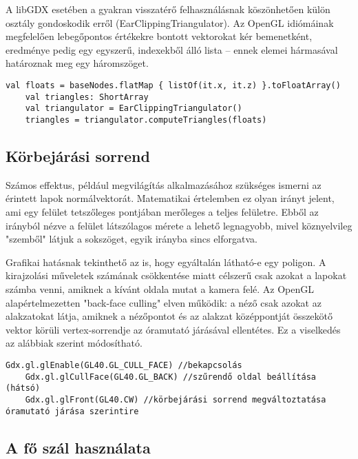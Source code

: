 A libGDX esetében a gyakran visszatérő felhasználásnak köszönhetően külön osztály gondoskodik erről (EarClippingTriangulator). Az OpenGL idiómáinak megfelelően lebegőpontos értékekre bontott vektorokat kér bemenetként, eredménye pedig egy egyszerű, indexekből álló lista -- ennek elemei hármasával határoznak meg egy háromszöget.

\begin{lstlisting}[caption=Példa az EarClippingTriangulator felhasználására]
    val floats = baseNodes.flatMap { listOf(it.x, it.z) }.toFloatArray()
    val triangles: ShortArray
    val triangulator = EarClippingTriangulator()
    triangles = triangulator.computeTriangles(floats)
\end{lstlisting}

\subsection{Körbejárási sorrend}

Számos effektus, például megvilágítás alkalmazásához szükséges ismerni az érintett lapok normálvektorát. Matematikai értelemben ez olyan irányt jelent, ami egy felület tetszőleges pontjában merőleges a teljes felületre. Ebből az irányból nézve a felület látszólagos mérete a lehető legnagyobb, mivel köznyelvileg "szemből" látjuk a sokszöget, egyik irányba sincs elforgatva.

Grafikai hatásnak tekinthető az is, hogy egyáltalán látható-e egy poligon. A kirajzolási műveletek számának csökkentése miatt célszerű csak azokat a lapokat számba venni, amiknek a kívánt oldala mutat a kamera felé. Az OpenGL alapértelmezetten "back-face culling" elven működik: a néző csak azokat az alakzatokat látja, amiknek a nézőpontot és az alakzat középpontját összekötő vektor körüli vertex-sorrendje az óramutató járásával ellentétes. Ez a viselkedés az alábbiak szerint módosítható.

\begin{lstlisting}[caption=Példa az OpenGL culling műveleteinek beállításaira libGDX-en keresztül]
    Gdx.gl.glEnable(GL40.GL_CULL_FACE) //bekapcsolás
    Gdx.gl.glCullFace(GL40.GL_BACK) //szűrendő oldal beállítása (hátsó)
    Gdx.gl.glFront(GL40.CW) //körbejárási sorrend megváltoztatása óramutató járása szerintire
\end{lstlisting}

\subsection{A fő szál használata}

